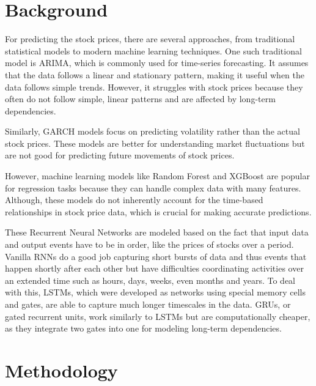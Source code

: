 \documentclass[10pt,twocolumn,a4paper]{article}
\begin{document}
\section{Background}
For predicting the stock prices, there are several approaches, from traditional statistical models to modern machine learning techniques. One such traditional model is ARIMA, which is commonly used for time-series forecasting. It assumes that the data follows a linear and stationary pattern, making it useful when the data follows simple trends. However, it struggles with stock prices because they often do not follow simple, linear patterns and are affected by long-term dependencies.

Similarly, GARCH models focus on predicting volatility rather than the actual stock prices. These models are better for understanding market fluctuations but are not good for predicting future movements of stock prices.

However, machine learning models like Random Forest and XGBoost are popular for regression tasks because they can handle complex data with many features. Although, these models do not inherently account for the time-based relationships in stock price data, which is crucial for making accurate predictions.

These Recurrent Neural Networks are modeled based on the fact that input data and output events have to be in order, like the prices of stocks over a period. Vanilla RNNs do a good job capturing short bursts of data and thus events that happen shortly after each other but have difficulties coordinating activities over an extended time such as hours, days, weeks, even months and years. To deal with this, LSTMs, which were developed as networks using special memory cells and gates, are able to capture much longer timescales in the data. GRUs, or gated recurrent units, work similarly to LSTMs but are computationally cheaper, as they integrate two gates into one for modeling long-term dependencies.
\section{Methodology}
\end{document}

